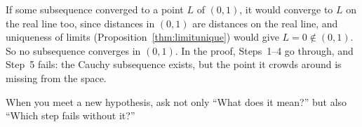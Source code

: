 If some subsequence converged to a point $L$ of $(0,1)$, it would converge to $L$ on the real line too, since distances in $(0,1)$ are distances on the real line, and uniqueness of limits (Proposition~\ref{thm:limitunique}) would give $L=0\notin(0,1)$. So no subsequence converges in $(0,1)$. In the proof, Steps~1--4 go through, and Step~5 fails: the Cauchy subsequence exists, but the point it crowds around is missing from the space.

When you meet a new hypothesis, ask not only ``What does it mean?'' but also ``Which step fails without it?''
